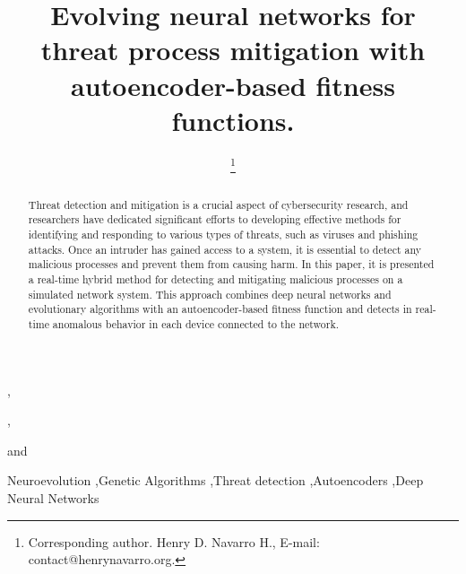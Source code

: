 \documentclass{iosart2c}
\begin{document}
\begin{frontmatter}                           %

%
\title{Evolving neural networks for threat process mitigation with autoencoder-based fitness functions.}



\author[A,B]{ \thanks{Corresponding author. Henry D. Navarro H., E-mail: contact@henrynavarro.org.}},
\author[B]{ },
\author[B]{ }
and
\author[B]{ }
\address[A]{Research and Development Lab, Vision Analytics, Avenida de Europa 19, 28224, Pozuelo de Alarcón, Madrid, Spain.\\
E-mail: contact@henrynavarro.org}
\address[B]{R\&D Department, Capgemini Engineering, Calle Campezo, 1, 28022, Madrid, Spain.\\
E-mail: engineering@capgemini.com}

\begin{abstract}
Threat detection and mitigation is a crucial aspect of cybersecurity research, and researchers have dedicated significant efforts to developing effective methods for identifying and responding to various types of threats, such as viruses and phishing attacks. Once an intruder has gained access to a system, it is essential to detect any malicious processes and prevent them from causing harm. In this paper, it is presented a real-time hybrid method for detecting and mitigating malicious processes on a simulated network system. This approach combines deep neural networks and evolutionary algorithms with an autoencoder-based fitness function and detects in real-time anomalous behavior in each device connected to the network.
\end{abstract}

\begin{keyword}
Neuroevolution \sep Genetic Algorithms \sep Threat detection \sep Autoencoders \sep Deep Neural Networks
\end{keyword}

\end{frontmatter}
\end{document}
